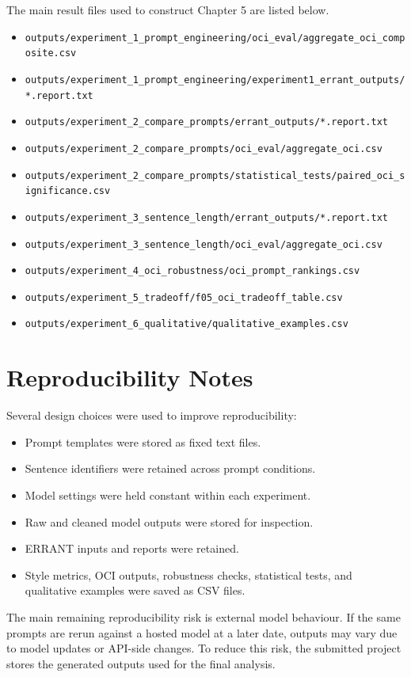 The main result files used to construct Chapter 5 are listed below.

\begin{itemize}
    \item \texttt{outputs/experiment\_1\_prompt\_engineering/oci\_eval/aggregate\_oci\_composite.csv}
    \item \texttt{outputs/experiment\_1\_prompt\_engineering/experiment1\_errant\_outputs/*.report.txt}
    \item \texttt{outputs/experiment\_2\_compare\_prompts/errant\_outputs/*.report.txt}
    \item \texttt{outputs/experiment\_2\_compare\_prompts/oci\_eval/aggregate\_oci.csv}
    \item \texttt{outputs/experiment\_2\_compare\_prompts/statistical\_tests/paired\_oci\_significance.csv}
    \item \texttt{outputs/experiment\_3\_sentence\_length/errant\_outputs/*.report.txt}
    \item \texttt{outputs/experiment\_3\_sentence\_length/oci\_eval/aggregate\_oci.csv}
    \item \texttt{outputs/experiment\_4\_oci\_robustness/oci\_prompt\_rankings.csv}
    \item \texttt{outputs/experiment\_5\_tradeoff/f05\_oci\_tradeoff\_table.csv}
    \item \texttt{outputs/experiment\_6\_qualitative/qualitative\_examples.csv}
\end{itemize}

\section{Reproducibility Notes}

Several design choices were used to improve reproducibility:

\begin{itemize}
    \item Prompt templates were stored as fixed text files.
    \item Sentence identifiers were retained across prompt conditions.
    \item Model settings were held constant within each experiment.
    \item Raw and cleaned model outputs were stored for inspection.
    \item ERRANT inputs and reports were retained.
    \item Style metrics, OCI outputs, robustness checks, statistical tests, and qualitative examples were saved as CSV files.
\end{itemize}

The main remaining reproducibility risk is external model behaviour. If the same prompts are rerun against a hosted model at a later date, outputs may vary due to model updates or API-side changes. To reduce this risk, the submitted project stores the generated outputs used for the final analysis.
